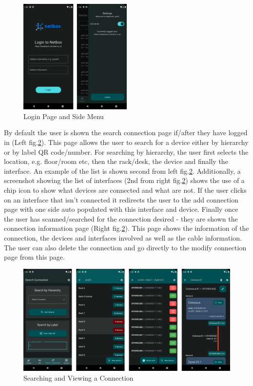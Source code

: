 \documentclass [11pt,a4paper]{article}
\begin{document}
\begin{figure}[H]
    \centering
    \includegraphics[width=0.5\textwidth]{images/final_login_menu.png}
    \caption{Login Page and Side Menu}
    \label{fig:login}
\end{figure}
By default the user is shown the search connection page if/after they have logged in (Left fig.\ref{fig:search_connection}). This page allows the user to search for a device either by hierarchy or by label QR code/number. For searching by hierarchy, the user first selects the location, e.g. floor/room etc, then the rack/desk, the device and finally the interface. An example of the list is shown second from left fig.\ref{fig:search_connection}. Additionally, a screenshot showing the list of interfaces (2nd from right fig.\ref{fig:search_connection}) shows the use of a chip icon to show what devices are connected and what are not. If the user clicks on an interface that isn't connected it redirects the user to the add connection page with one side auto populated with this interface and device. Finally once the user has scanned/searched for the connection desired - they are shown the connection information page (Right fig.\ref{fig:search_connection}). This page shows the information of the connection, the devices and interfaces involved as well as the cable information. The user can also delete the connection and go directly to the modify connection page from this page.

\begin{figure}[H]
    \centering
    \includegraphics[width=\textwidth]{images/final_search.png}
    \caption{Searching and Viewing a Connection}
    \label{fig:search_connection}
\end{figure}
\end{document}
